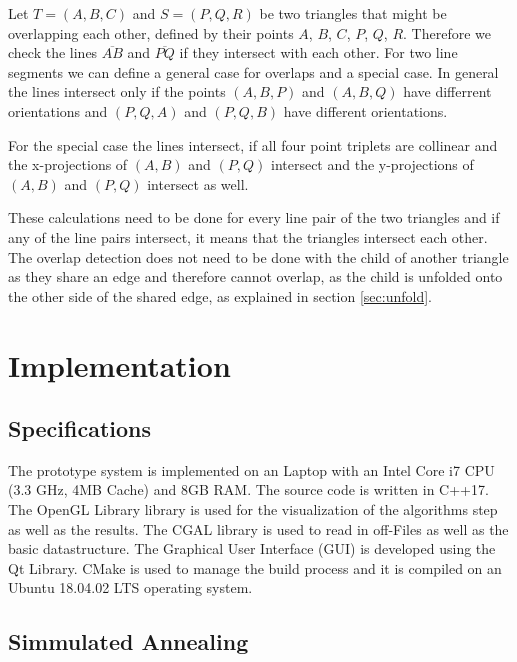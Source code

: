 \documentclass[draft,final]{vutinfth} %
\begin{document}
Let $T = (A,B,C)$ and $S = (P,Q,R)$ be two triangles that might be overlapping each other, defined by their points $A$, $B$, $C$, $P$, $Q$, $R$. Therefore we check the lines $\overline{AB}$ and $\overline{PQ}$ if they intersect with each other. For two line segments we can define a general case for overlaps and a special case. In general the lines intersect only if the points $(A,B,P)$ and $(A,B,Q)$ have differrent orientations and $(P,Q,A)$ and $(P,Q,B)$ have different orientations.

For the special case the lines intersect, if all four point triplets are collinear and the x-projections of $(A,B)$ and $(P,Q)$ intersect and the y-projections of $(A,B)$ and $(P,Q)$ intersect as well.

These calculations need to be done for every line pair of the two triangles and if any of the line pairs intersect, it means that the triangles intersect each other. The overlap detection does not need to be done with the child of another triangle as they share an edge and therefore cannot overlap, as the child is unfolded onto the other side of the shared edge, as explained in section \ref{sec:unfold}.

\chapter{Implementation}
\label{chap:Implementation}

\section{Specifications}

The prototype system is implemented on an Laptop with an Intel Core i7 CPU (3.3 GHz, 4MB Cache) and 8GB RAM. The source code is written in C++17. The OpenGL Library library is used for the visualization of the algorithms step as well as the results. The CGAL library is used to read in off-Files as well as the basic datastructure. The Graphical User Interface (GUI) is developed using the Qt Library. CMake is used to manage the build process and it is compiled on an Ubuntu 18.04.02 LTS operating system.

\section{Simmulated Annealing}
\end{document}
